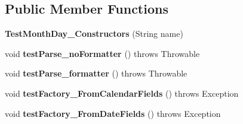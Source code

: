 \subsection*{Public Member Functions}
\begin{DoxyCompactItemize}
\item 
\hypertarget{classorg_1_1joda_1_1time_1_1_test_month_day___constructors_a8290b90bafe473b1c4475959c732f049}{{\bfseries Test\-Month\-Day\-\_\-\-Constructors} (String name)}\label{classorg_1_1joda_1_1time_1_1_test_month_day___constructors_a8290b90bafe473b1c4475959c732f049}

\item 
\hypertarget{classorg_1_1joda_1_1time_1_1_test_month_day___constructors_a5ccc4e29a5441ef0ceb2a9150621be21}{void {\bfseries test\-Parse\-\_\-no\-Formatter} ()  throws Throwable }\label{classorg_1_1joda_1_1time_1_1_test_month_day___constructors_a5ccc4e29a5441ef0ceb2a9150621be21}

\item 
\hypertarget{classorg_1_1joda_1_1time_1_1_test_month_day___constructors_a60593b15fbcaaaeb5f3ec1e2657e9d8b}{void {\bfseries test\-Parse\-\_\-formatter} ()  throws Throwable }\label{classorg_1_1joda_1_1time_1_1_test_month_day___constructors_a60593b15fbcaaaeb5f3ec1e2657e9d8b}

\item 
\hypertarget{classorg_1_1joda_1_1time_1_1_test_month_day___constructors_a97e9e3cbdc22103d471ffa012e640292}{void {\bfseries test\-Factory\-\_\-\-From\-Calendar\-Fields} ()  throws Exception }\label{classorg_1_1joda_1_1time_1_1_test_month_day___constructors_a97e9e3cbdc22103d471ffa012e640292}

\item 
\hypertarget{classorg_1_1joda_1_1time_1_1_test_month_day___constructors_a0a389fe851a088712e1ca3d24082f3ee}{void {\bfseries test\-Factory\-\_\-\-From\-Date\-Fields} ()  throws Exception }\label{classorg_1_1joda_1_1time_1_1_test_month_day___constructors_a0a389fe851a088712e1ca3d24082f3ee}


\end{DoxyCompactItemize}
